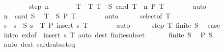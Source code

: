 \begin{isabellebody}
\ \ \isamarkupfalse%
\isanewline
\ \ \ \ \isamarkupfalse%
\ {\isacharparenleft}{\kern0pt}step\ n{\isacharparenright}{\kern0pt}\isanewline
\ \ \ \ \isamarkupfalse%
\ \isamarkupfalse%
\ T\ \ T{\isacharcolon}{\kern0pt}\ {\isachardoublequoteopen}T\ {\isasymsubseteq}\ S{\isachardoublequoteclose}\ {\isachardoublequoteopen}card\ T\ {\isacharequal}{\kern0pt}\ n{\isachardoublequoteclose}\ {\isachardoublequoteopen}P\ T{\isachardoublequoteclose}\isanewline
\ \ \ \ \ \ \isamarkupfalse%
\ auto\isanewline
\ \ \ \ \isamarkupfalse%
\ {\isacartoucheopen}n\ {\isacharless}{\kern0pt}\ card\ S{\isacartoucheclose}\ \isamarkupfalse%
\ {\isachardoublequoteopen}T\ {\isasymsubset}\ S{\isachardoublequoteclose}\ {\isachardoublequoteopen}P\ T{\isachardoublequoteclose}\isanewline
\ \ \ \ \ \ \isamarkupfalse%
\ auto\isanewline
\ \ \ \ \isamarkupfalse%
\ select{\isacharbrackleft}{\kern0pt}of\ T{\isacharbrackright}{\kern0pt}\ \isamarkupfalse%
\ s\ \ {\isachardoublequoteopen}s\ {\isasymin}\ S{\isachardoublequoteclose}\ {\isachardoublequoteopen}s\ {\isasymnotin}\ T{\isachardoublequoteclose}\ {\isachardoublequoteopen}P\ {\isacharparenleft}{\kern0pt}insert\ s\ T{\isacharparenright}{\kern0pt}{\isachardoublequoteclose}\isanewline
\ \ \ \ \ \ \isamarkupfalse%
\ auto\isanewline
\ \ \ \ \isamarkupfalse%
\ step{\isacharparenleft}{\kern0pt}{}{\isacharparenright}{\kern0pt}\ T\ {\isacartoucheopen}finite\ S{\isacartoucheclose}\ \isamarkupfalse%
\ {\isacharquery}{\kern0pt}case\isanewline
\ \ \ \ \ \ \isamarkupfalse%
\ {\isacharparenleft}{\kern0pt}intro\ exI{\isacharbrackleft}{\kern0pt}of\ {\isacharunderscore}{\kern0pt}\ {\isachardoublequoteopen}insert\ s\ T{\isachardoublequoteclose}{\isacharbrackright}{\kern0pt}{\isacharparenright}{\kern0pt}\ {\isacharparenleft}{\kern0pt}auto\ dest{\isacharcolon}{\kern0pt}\ finite{\isacharunderscore}{\kern0pt}subset{\isacharparenright}{\kern0pt}\isanewline
\ \ \isamarkupfalse%
\isanewline
\ \ \isamarkupfalse%
\ {\isacartoucheopen}finite\ S{\isacartoucheclose}\ \isamarkupfalse%
\ {\isachardoublequoteopen}P\ S{\isachardoublequoteclose}\isanewline
\ \ \ \ \isamarkupfalse%
\ {\isacharparenleft}{\kern0pt}auto\ dest{\isacharcolon}{\kern0pt}\ card{\isacharunderscore}{\kern0pt}subset{\isacharunderscore}{\kern0pt}eq{\isacharparenright}{\kern0pt}\isanewline

\end{isabellebody}
